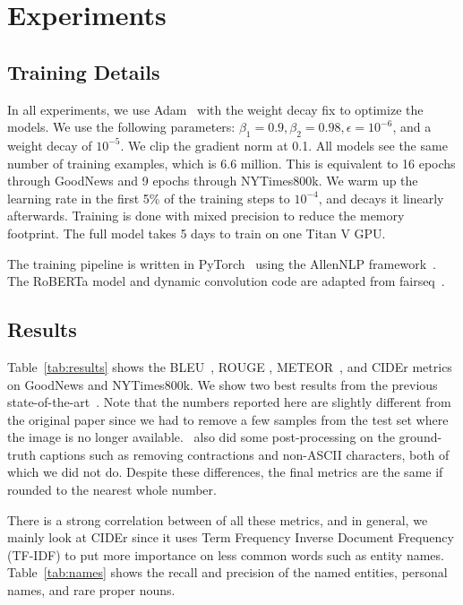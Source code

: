 
\section{Experiments}

\subsection{Training Details}

In all experiments, we use Adam~\cite{Kingma2015Adam} with the weight decay fix
\cite{Loshchilov2018DecoupledWD} to optimize the models. We use the following
parameters: $\beta_1 = 0.9, \beta_2 = 0.98, \epsilon = 10^{-6}$, and a weight
decay of $10^{-5}$. We clip the gradient norm at 0.1. All models see the same
number of training examples, which is 6.6 million. This is equivalent to 16
epochs through GoodNews and 9 epochs through NYTimes800k. We warm up the
learning rate in the first 5\% of the training steps to $10^{-4}$, and decays
it linearly afterwards. Training is done with mixed precision to reduce the
memory footprint. The full model takes 5 days to train on one Titan V GPU.


The training pipeline is written in PyTorch~\cite{Paszke2017Automatic} using
the AllenNLP framework~\cite{Gardner2017AllenNLP}. The RoBERTa model and
dynamic convolution code are adapted from fairseq~\cite{Ott2019Fairseq}.



\subsection{Results}


Table~\ref{tab:results} shows the BLEU~\cite{Papineni2002Bleu}, ROUGE
\cite{Lin2004ROUGE}, METEOR~\cite{Denkowski2014Meteor}, and CIDEr
\cite{Vedantam2015CIDEr} metrics on GoodNews and NYTimes800k. We show two best
results from the previous state-of-the-art~\cite{Biten2019GoodNews}. Note that
the numbers reported here are slightly different from the original paper since
we had to remove a few samples from the test set where the image is no longer
available.~\cite{Biten2019GoodNews} also did some post-processing on the
ground-truth captions such as removing contractions and non-ASCII characters,
both of which we did not do. Despite these differences, the final metrics
are the same if rounded to the nearest whole number.

There is a strong correlation between of all these metrics, and in general, we
mainly look at CIDEr since it uses Term Frequency Inverse Document Frequency
(TF-IDF) to put more importance on less common words such as entity names.
Table~\ref{tab:names} shows the recall and precision of the named entities,
personal names, and rare proper nouns.


